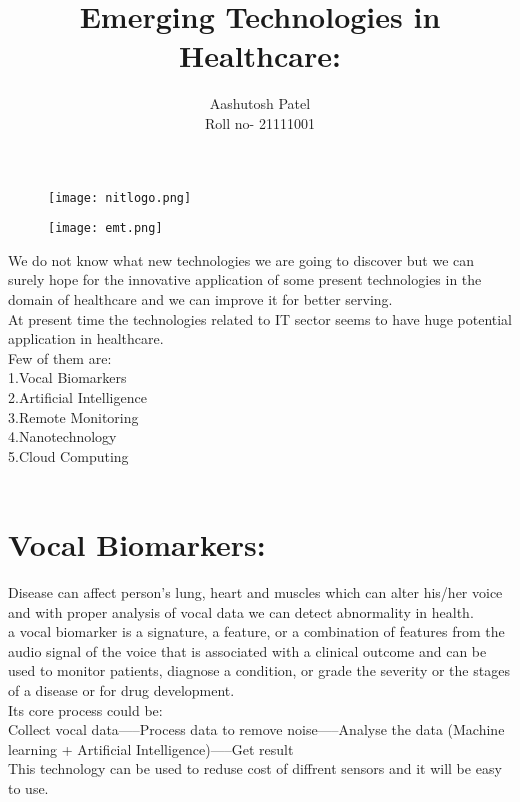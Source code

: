 \documentclass[a4paper,12pt]{article}
\author{Aashutosh Patel \\ Roll no- 21111001}
\begin{document}
	\begin{figure}
		\centering
		\texttt{[image: nitlogo.png]}
	\end{figure}
	\maketitle
	\clearpage
	
	{\huge \centering \title {Emerging Technologies in Healthcare:}}
	
	\begin{figure}[h]
		
		\texttt{[image: emt.png]}
	\end{figure}
	We do not know what new technologies we are going to discover but we can surely hope for the innovative application
	of some present technologies in the domain of healthcare and we can improve it for better serving.
	\\
	At present time the technologies related to IT sector seems to have huge potential application in healthcare.
	\\
	Few of them are:
	\\
	1.Vocal Biomarkers
	\\
	2.Artificial Intelligence
	\\
	3.Remote Monitoring
	\\
	4.Nanotechnology
	\\
	5.Cloud Computing
	\\
	\\
	\section{Vocal Biomarkers:}
	Disease can affect person's lung, heart and muscles which can alter his/her voice and with proper analysis of vocal data we can detect abnormality in health.
	\\
	a vocal biomarker is a signature, a feature, or a combination of features from the audio signal of the voice that is
	associated with a clinical outcome and can be used to monitor patients, diagnose a condition, or grade the severity
	or the stages of a disease or for drug development.
	\newline
	\\
	Its core process could be:
	\\
	Collect vocal data-----Process data to remove noise-----Analyse the data (Machine learning + Artificial Intelligence)-----Get result
	\\
	This technology can be used to reduse cost of diffrent sensors and it will be easy to use.
	
\end{document}
